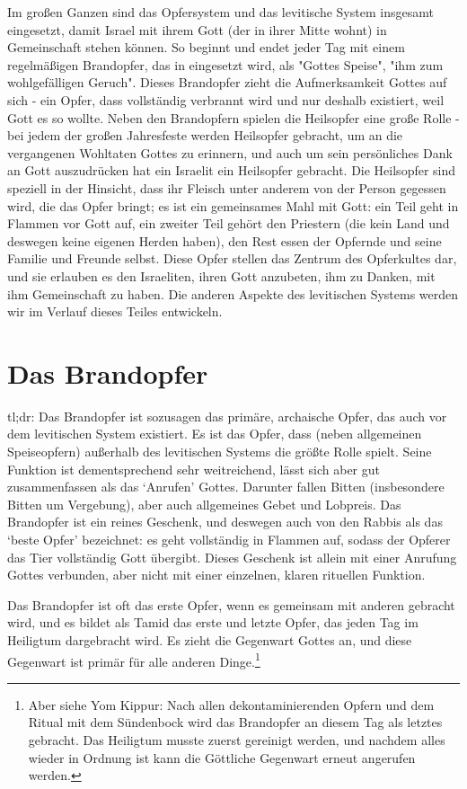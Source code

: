 Im großen Ganzen sind das Opfersystem und das levitische System insgesamt eingesetzt, damit Israel mit ihrem Gott (der in ihrer Mitte wohnt) in Gemeinschaft stehen können.
So beginnt und endet jeder Tag mit einem regelmäßigen Brandopfer, das in  eingesetzt wird, als "Gottes Speise", "ihm zum wohlgefälligen Geruch".
Dieses Brandopfer zieht die Aufmerksamkeit Gottes auf sich - ein Opfer, dass vollständig verbrannt wird und nur deshalb existiert, weil Gott es so wollte.
Neben den Brandopfern spielen die Heilsopfer eine große Rolle -
bei jedem der großen Jahresfeste werden Heilsopfer gebracht, um an die vergangenen Wohltaten Gottes zu erinnern, und auch um sein persönliches Dank an Gott auszudrücken hat ein Israelit ein Heilsopfer gebracht.
Die Heilsopfer sind speziell in der Hinsicht, dass ihr Fleisch unter anderem von der Person gegessen wird, die das Opfer bringt; es ist ein gemeinsames Mahl mit Gott:
ein Teil geht in Flammen vor Gott auf, ein zweiter Teil gehört den Priestern (die kein Land und deswegen keine eigenen Herden haben), den Rest essen der Opfernde und seine Familie und Freunde selbst.
Diese Opfer stellen das Zentrum des Opferkultes dar, und sie erlauben es den Israeliten, ihren Gott anzubeten, ihm zu Danken, mit ihm Gemeinschaft zu haben.
Die anderen Aspekte des levitischen Systems werden wir im Verlauf dieses Teiles entwickeln.

\section{Das Brandopfer}
tl;dr:
Das Brandopfer ist sozusagen das primäre, archaische Opfer, das auch vor dem levitischen System existiert.
Es ist das Opfer, dass (neben allgemeinen Speiseopfern) außerhalb des levitischen Systems die größte Rolle spielt.
Seine Funktion ist dementsprechend sehr weitreichend, lässt sich aber gut zusammenfassen als das `Anrufen' Gottes.
Darunter fallen Bitten (insbesondere Bitten um Vergebung), aber auch allgemeines Gebet und Lobpreis.
Das Brandopfer ist ein reines Geschenk, und deswegen auch von den Rabbis als das `beste Opfer' bezeichnet:
es geht vollständig in Flammen auf, sodass der Opferer das Tier vollständig Gott übergibt.
Dieses Geschenk ist allein mit einer Anrufung Gottes verbunden, aber nicht mit einer einzelnen, klaren rituellen Funktion.

Das Brandopfer ist oft das erste Opfer, wenn es gemeinsam mit anderen gebracht wird, und es bildet als Tamid das erste und letzte Opfer, das jeden Tag im Heiligtum dargebracht wird.
Es zieht die Gegenwart Gottes an, und diese Gegenwart ist primär für alle anderen Dinge.\footnote{
Aber siehe Yom Kippur: Nach allen dekontaminierenden Opfern und dem Ritual mit dem Sündenbock wird das Brandopfer an diesem Tag als letztes gebracht.
Das Heiligtum musste zuerst gereinigt werden, und nachdem alles wieder in Ordnung ist kann die Göttliche Gegenwart erneut angerufen werden.}

